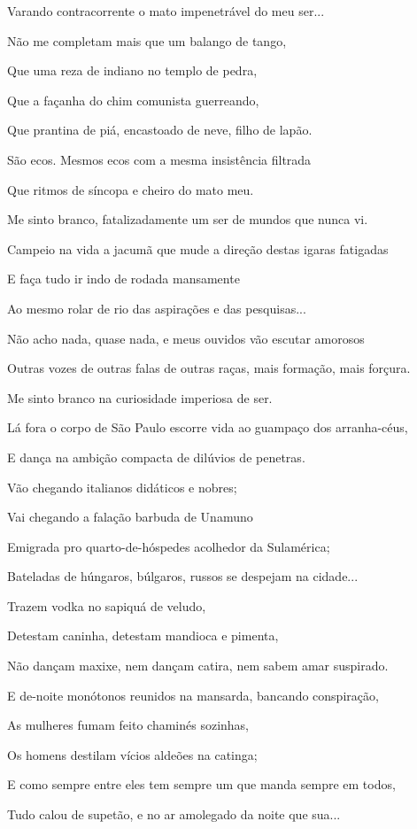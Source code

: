 Varando contracorrente o mato impenetrável do meu ser...

Não me completam mais que um balango de tango,

Que uma reza de indiano no templo de pedra,

Que a façanha do chim comunista guerreando,

Que prantina de piá, encastoado de neve, filho de lapão.

São ecos. Mesmos ecos com a mesma insistência filtrada

Que ritmos de síncopa e cheiro do mato meu.

Me sinto branco, fatalizadamente um ser de mundos que nunca vi.

Campeio na vida a jacumã que mude a direção destas igaras fatigadas

E faça tudo ir indo de rodada mansamente

Ao mesmo rolar de rio das aspirações e das pesquisas...

Não acho nada, quase nada, e meus ouvidos vão escutar amorosos

Outras vozes de outras falas de outras raças, mais formação, mais
forçura.

Me sinto branco na curiosidade imperiosa de ser.

Lá fora o corpo de São Paulo escorre vida ao guampaço dos arranha-céus,

E dança na ambição compacta de dilúvios de penetras.

Vão chegando italianos didáticos e nobres;

Vai chegando a falação barbuda de Unamuno

Emigrada pro quarto-de-hóspedes acolhedor da Sulamérica;

Bateladas de húngaros, búlgaros, russos se despejam na cidade...

Trazem vodka no sapiquá de veludo,

Detestam caninha, detestam mandioca e pimenta,

Não dançam maxixe, nem dançam catira, nem sabem amar suspirado.

E de-noite monótonos reunidos na mansarda, bancando conspiração,

As mulheres fumam feito chaminés sozinhas,

Os homens destilam vícios aldeões na catinga;

E como sempre entre eles tem sempre um que manda sempre em todos,

Tudo calou de supetão, e no ar amolegado da noite que sua...

